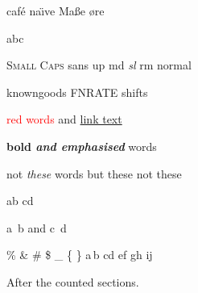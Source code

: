 caf\'e na\"{\i}ve Ma\ss e \o re

a\textendash b\textemdash c

\textsc{Small Caps} \textsf{sans} \textup{up} \textmd{md} \textsl{sl} \textrm{rm} \textnormal{normal}

\Glspl{knowngood} \Gls{FNRATE} \glspl{shift}

\textcolor{red}{red words} and \href{https://example.org}{link text}

\textbf{bold \emph{and emphasised}} words

{\wordcountoff not \emph{these} words} but {these \wordcountoff not} these

{a}{b} c{d}

a\ b and c\
d

\% \& \# \$ \_ \{ \} a\,b c\;d e\!f g\/h i\-j

\stopwordcount
After the counted sections.
